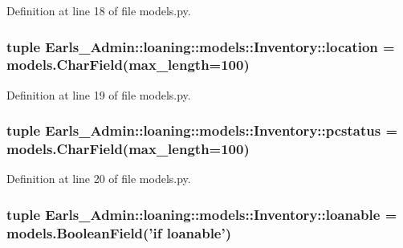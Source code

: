 Definition at line 18 of file models.py.\hypertarget{classEarls__Admin_1_1loaning_1_1models_1_1Inventory_2f7a98aa7f900588aebd4cb8ee070632}{
\subsubsection[location]{\setlength{\rightskip}{0pt plus 5cm}tuple {\bf Earls\_\-Admin::loaning::models::Inventory::location} = models.CharField(max\_\-length=100)}}
\label{classEarls__Admin_1_1loaning_1_1models_1_1Inventory_2f7a98aa7f900588aebd4cb8ee070632}




Definition at line 19 of file models.py.\hypertarget{classEarls__Admin_1_1loaning_1_1models_1_1Inventory_58a03ca07346f2d346c9a6a5e9061bc7}{
\subsubsection[pcstatus]{\setlength{\rightskip}{0pt plus 5cm}tuple {\bf Earls\_\-Admin::loaning::models::Inventory::pcstatus} = models.CharField(max\_\-length=100)}}
\label{classEarls__Admin_1_1loaning_1_1models_1_1Inventory_58a03ca07346f2d346c9a6a5e9061bc7}




Definition at line 20 of file models.py.\hypertarget{classEarls__Admin_1_1loaning_1_1models_1_1Inventory_7684c24fbbe4aa3076ea2c49d8f217ef}{
\subsubsection[loanable]{\setlength{\rightskip}{0pt plus 5cm}tuple {\bf Earls\_\-Admin::loaning::models::Inventory::loanable} = models.BooleanField('if {\bf loanable}')}}
\label{classEarls__Admin_1_1loaning_1_1models_1_1Inventory_7684c24fbbe4aa3076ea2c49d8f217ef}




